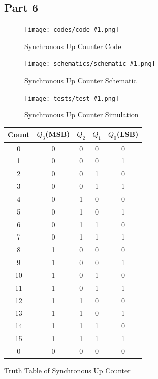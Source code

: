 \documentclass[pdftex,12pt,a4paper]{article}
\theoremstyle{plain}
\newcommand{\parts}[1]{
\begin{figure}[H]
	\centering
	\texttt{[image: codes/code-\#1.png]}
	\caption{#1 Code}
	\label{fig7}
    \end{figure}
\begin{figure}[H]
	\centering
	\texttt{[image: schematics/schematic-\#1.png]}
	\caption{#1 Schematic}
	\label{fig7}
    \end{figure}
\begin{figure}[H]
	\centering
	\texttt{[image: tests/test-\#1.png]}
	\caption{#1 Simulation}
	\label{fig7}
\end{figure}
}
\begin{document}
\subsection{Part 6}
\parts{Synchronous Up Counter}
\begin{center}
\begin{tabular}{c | c c c c }
Count & $Q_3$(MSB) & $Q_2$ & $Q_1$ & $Q_0$(LSB) \\
\hline 
0 & 0 & 0 & 0 & 0 \\
1 & 0 & 0 & 0 & 1 \\
2 & 0 & 0 & 1 & 0 \\
3 & 0 & 0 & 1 & 1 \\
4 & 0 & 1 & 0 & 0 \\
5 & 0 & 1 & 0 & 1 \\
6 & 0 & 1 & 1 & 0 \\
7 & 0 & 1 & 1 & 1 \\
8 & 1 & 0 & 0 & 0 \\
9 & 1 & 0 & 0 & 1 \\
10 & 1 & 0 & 1 & 0 \\
11 & 1 & 0 & 1 & 1 \\
12 & 1 & 1 & 0 & 0 \\
13 & 1 & 1 & 0 & 1 \\
14 & 1 & 1 & 1 & 0 \\
15 & 1 & 1 & 1 & 1 \\
0 & 0 & 0 & 0 & 0 \\
\end{tabular}\par\vspace{1em}
 Truth Table of Synchronous Up Counter
\end{center}
\end{document}
